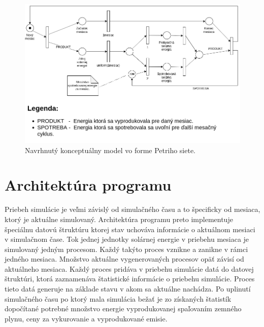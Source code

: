 \documentclass[a4paper, 11pt]{article}
\begin{document}
\begin{figure}[h] 
	\centering
	\includegraphics[width=.8\paperwidth]{petri_net.png}
	\caption{Navrhnutý konceptuálny model vo forme Petriho siete.}
	\label{obr1}
\end{figure} \label{obr_petri_net}

\section{Architektúra programu}
Priebeh simulácie je veľmi závislý od simulačného času a to špecificky od mesiaca, ktorý je aktuálne simulovaný. Architektúra programu preto implementuje špeciálnu datovú štruktúru ktorej stav uchováva informácie o aktuálnom mesiaci v simulačnom čase. Tok jednej jednotky solárnej energie v priebehu mesiaca je simulovaný jedným procesom. Každý takýto proces vznikne a zanikne v rámci jedného mesiaca. Množstvo aktuálne vygenerovaných procesov opäť závisí od aktuálneho mesiaca. Každý proces pridáva v priebehu simulácie datá do datovej štruktúri, ktorá zaznamenáva štatistické informácie o priebehu simulácie. Proces tieto datá generuje na základe stavu v akom sa aktuálne nachádza. Po uplinutí simulačného času po ktorý mala simulácia bežať je zo získaných štatistík dopočítané potrebné množstvo energie vyprodukovanej spaľovaním zemného plynu, ceny za vykurovanie a vyprodukované emisie.
\end{document}
